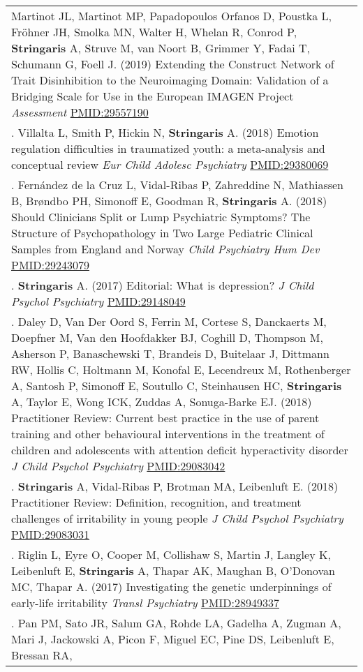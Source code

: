 \documentclass[
]{article}
\begin{document}
\begin{longtable}[]{@{}
  >{\raggedright\arraybackslash}p{}@{}}
Martinot JL, Martinot MP, Papadopoulos Orfanos D, Poustka L, Fröhner JH,
Smolka MN, Walter H, Whelan R, Conrod P, \textbf{Stringaris} A, Struve
M, van Noort B, Grimmer Y, Fadai T, Schumann G, Foell J. (2019)
Extending the Construct Network of Trait Disinhibition to the
Neuroimaging Domain: Validation of a Bridging Scale for Use in the
European IMAGEN Project \emph{Assessment} \url{PMID:29557190} \\
108. Villalta L, Smith P, Hickin N, \textbf{Stringaris} A. (2018)
Emotion regulation difficulties in traumatized youth: a meta-analysis
and conceptual review \emph{Eur Child Adolesc Psychiatry}
\url{PMID:29380069} \\
109. Fernández de la Cruz L, Vidal-Ribas P, Zahreddine N, Mathiassen B,
Brøndbo PH, Simonoff E, Goodman R, \textbf{Stringaris} A. (2018) Should
Clinicians Split or Lump Psychiatric Symptoms? The Structure of
Psychopathology in Two Large Pediatric Clinical Samples from England and
Norway \emph{Child Psychiatry Hum Dev} \url{PMID:29243079} \\
110. \textbf{Stringaris} A. (2017) Editorial: What is depression?
\emph{J Child Psychol Psychiatry} \url{PMID:29148049} \\
111. Daley D, Van Der Oord S, Ferrin M, Cortese S, Danckaerts M,
Doepfner M, Van den Hoofdakker BJ, Coghill D, Thompson M, Asherson P,
Banaschewski T, Brandeis D, Buitelaar J, Dittmann RW, Hollis C, Holtmann
M, Konofal E, Lecendreux M, Rothenberger A, Santosh P, Simonoff E,
Soutullo C, Steinhausen HC, \textbf{Stringaris} A, Taylor E, Wong ICK,
Zuddas A, Sonuga-Barke EJ. (2018) Practitioner Review: Current best
practice in the use of parent training and other behavioural
interventions in the treatment of children and adolescents with
attention deficit hyperactivity disorder \emph{J Child Psychol
Psychiatry} \url{PMID:29083042} \\
112. \textbf{Stringaris} A, Vidal-Ribas P, Brotman MA, Leibenluft E.
(2018) Practitioner Review: Definition, recognition, and treatment
challenges of irritability in young people \emph{J Child Psychol
Psychiatry} \url{PMID:29083031} \\
113. Riglin L, Eyre O, Cooper M, Collishaw S, Martin J, Langley K,
Leibenluft E, \textbf{Stringaris} A, Thapar AK, Maughan B, O'Donovan MC,
Thapar A. (2017) Investigating the genetic underpinnings of early-life
irritability \emph{Transl Psychiatry} \url{PMID:28949337} \\
114. Pan PM, Sato JR, Salum GA, Rohde LA, Gadelha A, Zugman A, Mari J,
Jackowski A, Picon F, Miguel EC, Pine DS, Leibenluft E, Bressan RA,

\end{longtable}
\end{document}
